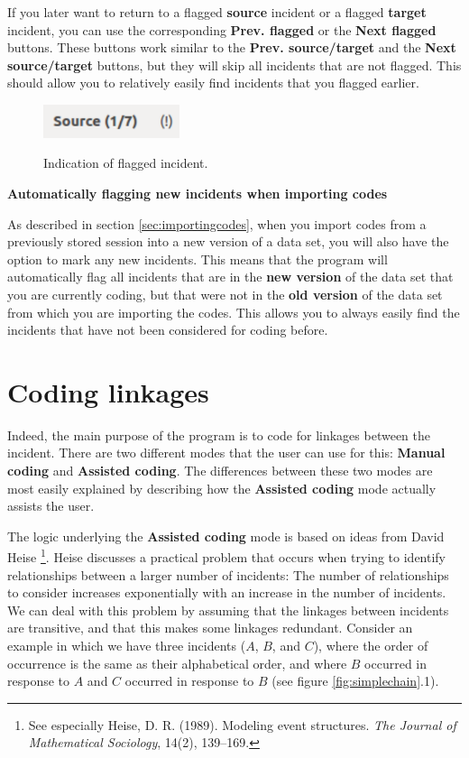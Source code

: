 \documentclass{memoir}
\begin{document}
If you later want to return to a flagged \textbf{source} incident or a flagged \textbf{target} incident, you can use the corresponding \textbf{Prev. flagged} or the \textbf{Next flagged} buttons. These buttons work similar to the \textbf{Prev. source/target} and the \textbf{Next source/target} buttons, but they will skip all incidents that are not flagged. This should allow you to relatively easily find incidents that you flagged earlier.

\begin{figure}[h!]
  \centering
  \caption{Indication of flagged incident.}
  \includegraphics[width=40mm]{Screenshot_9.pdf}
  \label{fig:flaggedincident}
\end{figure}


\begin{framed}
\textbf{Automatically flagging new incidents when importing codes}
  
  As described in section \ref{sec:importingcodes}, when you import codes from a previously stored session into a new version of a data set, you will also have the option to mark any new incidents. This means that the program will automatically flag all incidents that are in the \textbf{new version} of the data set that you are currently coding, but that were not in the \textbf{old version} of the data set from which you are importing the codes. This allows you to always easily find the incidents that have not been considered for coding before. 
\end{framed}


\section{Coding linkages}
\label{sec:codinglinkages}

Indeed, the main purpose of the program is to code for linkages between the incident. There are two different modes that the user can use for this: \textbf{Manual coding} and \textbf{Assisted coding}. The differences between these two modes are most easily explained by describing how the \textbf{Assisted coding} mode actually assists the user.

The logic underlying the \textbf{Assisted coding} mode is based on ideas from David Heise \footnote{See especially Heise, D. R. (1989). Modeling event structures. \emph{The Journal of Mathematical Sociology}, 14(2), 139–169.}. Heise discusses a practical problem that occurs when trying to identify relationships between a larger number of incidents: The number of relationships to consider increases exponentially with an increase in the number of incidents. We can deal with this problem by assuming that the linkages between incidents are transitive, and that this makes some linkages redundant. Consider an example in which we have three incidents (\(A\), \(B\), and \(C\)), where the order of occurrence is the same as their alphabetical order, and where \(B\) occurred in response to \(A\) and \(C\) occurred in response to \(B\) (see figure \ref{fig:simplechain}.1).
\end{document}
